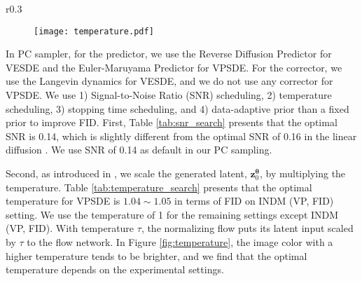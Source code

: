 \documentclass{article}
\theoremstyle{definition}
\theoremstyle{remark}
\begin{document}
	\begin{wrapfigure}{r}{0.3\textwidth}
		\vskip -0.15in
		\begin{subfigure}{\linewidth}
			\centering
			\texttt{[image: temperature.pdf]}
		\end{subfigure}
		\caption{Ablation study for the flow temperature.}
		\label{fig:temperature}
		\vskip -0.3in
	\end{wrapfigure}
	In PC sampler, for the predictor, we use the Reverse Diffusion Predictor for VESDE and the Euler-Maruyama Predictor for VPSDE. For the corrector, we use the Langevin dynamics \cite{song2019generative} for VESDE, and we do not use any corrector for VPSDE. We use 1) Signal-to-Noise Ratio (SNR) scheduling, 2) temperature scheduling, 3) stopping time scheduling, and 4) data-adaptive prior than a fixed prior to improve FID. First, Table \ref{tab:snr_search} presents that the optimal SNR is 0.14, which is slightly different from the optimal SNR of 0.16 in the linear diffusion \cite{song2020score}. We use SNR of 0.14 as default in our PC sampling. 
	
	Second, as introduced in \citet{kingma2018glow}, we scale the generated latent, $\mathbf{z}_{0}^{\bm{\theta}}$, by multiplying the temperature. Table \ref{tab:temperature_search} presents that the optimal temperature for VPSDE is $1.04\sim 1.05$ in terms of FID on INDM (VP, FID) setting. We use the temperature of 1 for the remaining settings except INDM (VP, FID). With temperature $\tau$, the normalizing flow puts its latent input scaled by $\tau$ to the flow network. In Figure \ref{fig:temperature}, the image color with a higher temperature tends to be brighter, and we find that the optimal temperature depends on the experimental settings.
	
\end{document}
